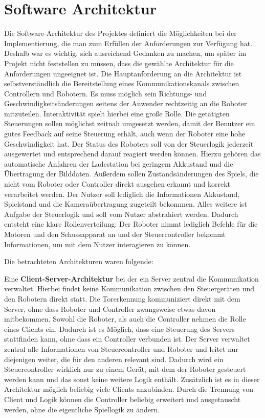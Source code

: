 \chapter{Software Architektur}
\label{sec:software-architektur}

Die Software-Architektur des Projektes definiert die Möglichkeiten bei der Implementierung, die man zum Erfüllen der Anforderungen zur Verfügung hat. Deshalb war es wichtig, sich ausreichend Gedanken zu machen, um später im Projekt nicht feststellen zu müssen, dass die gewählte Architektur für die Anforderungen ungeeignet ist. Die Hauptanforderung an die Architektur ist selbstverständlich die Bereitstellung eines Kommunikationskanals zwischen Controllern und Robotern. Es muss möglich sein Richtungs- und Geschwindigkeitsänderungen seitens der Anwender rechtzeitig an die Roboter mitzuteilen. Interaktivität spielt hierbei eine große Rolle. Die getätigten Steuerungen sollen möglichst zeitnah umgesetzt werden, damit der Benutzer ein gutes Feedback auf seine Steuerung erhält, auch wenn der Roboter eine hohe Geschwindigkeit hat. Der Status des Roboters soll von der Steuerlogik jederzeit ausgewertet und entsprechend darauf reagiert werden können. Hierzu gehören das automatische Anfahren der Ladestation bei geringem Akkustand und die Übertragung der Bilddaten. Außerdem sollen Zustandsänderungen des Spiels, die nicht vom Roboter oder Controller direkt ausgehen erkannt und korrekt verarbeitet werden. Der Nutzer soll lediglich die Informationen Akkustand, Spielstand und die Kameraübertragung zugeteilt bekommen. Alles weitere ist Aufgabe der Steuerlogik und soll vom Nutzer abstrahiert werden. Dadurch entsteht eine klare Rollenverteilung: Der Roboter nimmt lediglich Befehle für die Motoren und den Schussapparat an und der Steuercontroller bekommt Informationen, um mit dem Nutzer interagieren zu können.

Die betrachteten Architekturen waren folgende:

Eine \textbf{Client-Server-Architektur} bei der ein Server zentral die Kommunikation verwaltet. Hierbei findet keine Kommunikation zwischen den Steuergeräten und den Robotern direkt statt. Die Torerkennung kommuniziert direkt mit dem Server, ohne dass Roboter und Controller zwangsweise etwas davon mitbekommen. Sowohl die Roboter, als auch die Controller nehmen die Rolle eines Clients ein. Dadurch ist es Möglich, dass eine Steuerung des Servers stattfinden kann, ohne dass ein Controller verbunden ist. Der Server verwaltet zentral alle Informationen von Steuercontroller und Roboter und leitet nur diejenigen weiter, die für den anderen relevant sind. Dadurch wird ein Steuercontroller wirklich nur zu einem Gerät, mit dem der Roboter gesteuert werden kann und das sonst keine weitere Logik enthält. Zusätzlich ist es in dieser Architektur möglich beliebig viele Clients anzubinden. Durch die Trennung von Client und Logik können die Controller beliebig erweitert und ausgetauscht werden, ohne die eigentliche Spiellogik zu ändern.


